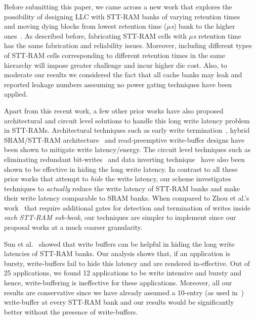 Before submitting this paper, we came across a new work that explores the possibility of designing LLC with STT-RAM banks of varying retention times and moving dying blocks from lowest retention time ({\it $\mu$s}) bank to the higher ones~\cite{multi-level-retention}. As described before, fabricating STT-RAM cells with {\it $\mu$s} retention time has the same fabrication and reliability issues. Moreover, including different types of STT-RAM cells corresponding to different retention times in the same hierarchy will impose greater challenge and incur higher die cost. Also, to moderate our results we considered the fact that all cache banks may leak and reported leakage numbers asssuming no power gating techniques have been applied.

Apart from this recent work, a few other prior works have also proposed architectural and circuit level
solutions to handle this long write latency problem in STT-RAMs. Architectural techniques such as
early write termination~\cite{mram-energy-reduction}, hybrid SRAM/STT-RAM
architecture~\cite{gsun-hpca, Qureshi:2009:SHPMM} and read-preemptive write-buffer designs have been
shown to mitigate write latency/energy. The circuit level techniques such as eliminating redundant
bit-writes~\cite{mram-energy-reduction} and data inverting technique~\cite{gsun-hpca} have also been
shown to be effective in hiding the long write latency. In contrast to all these prior works that
attempt to {\it hide} the write latency, our scheme investigates techniques to {\it actually} reduce
the write latency of STT-RAM banks and make their write latency comparable to SRAM banks. When
compared to Zhou et al.'s work~\cite{mram-energy-reduction} that require additional gates for
detection and termination of writes inside {\it each STT-RAM sub-bank}, our techniques are simpler to
implement since our proposal works at a much coarser granularity.

Sun et al.~\cite{gsun-hpca} showed that write buffers can be helpful in hiding the long write
latencies of STT-RAM banks. Our analysis shows that, if an application is bursty, write-buffers fail
to hide this latency and are rendered in-effective. Out of 25 applications, we found 12 applications
to be write intensive and bursty and hence, write-buffering is ineffective for these applications.
Moreover, all our results are conservative since we have already assumed a 10-entry (as used
in~\cite{gsun-hpca}) write-buffer at every STT-RAM bank and our results would be significantly better
without the presence of write-buffers.

